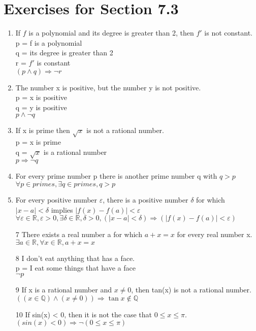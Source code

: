 \documentclass[12pt]{article}
\begin{document}
\section*{Exercises for Section 7.3}
\begin{enumerate}
	\item If $f$ is a polynomial and its degree is greater than 2, then $f'$ is not constant.\\
	    p = f is a polynomial\\
	    q = its degree is greater than 2\\
	    r = $f'$ is constant\\
	    $(p \land q) \Rightarrow \neg r$
	\item The number x is positive, but the number y is not positive.\\
	    p = x is positive\\
	    q = y is positive\\
	    $p \land \neg q$
	\item If x is prime then $\sqrt{x}$ is not a rational number.\\
	    p = x is prime\\
	    q = $\sqrt{x}$ is a rational number\\
	    $p \Rightarrow \neg q$
	\item For every prime number p there is another prime number q with $q>p$\\
	    $\forall p \in primes, \exists q \in primes, q > p$
	\item For every positive number $\varepsilon$, there is a positive number $\delta$ for which $|x-a| < \delta$ implies $|f(x) - f(a)| < \varepsilon$\\
	    $\forall \varepsilon \in \mathbb{R}, \varepsilon > 0, \exists \delta \in \mathbb{R}, \delta > 0, (|x-a| < \delta) \Rightarrow (|f(x) - f(a)| < \varepsilon)$
	\item [7] There exists a real number a for which $a+x=x$ for every real number x.\\
	    $\exists a \in \mathbb{R}, \forall x \in \mathbb{R}, a+x=x$
	\item [8] I don't eat anything that has a face.\\
	    p = I eat some things that have a face\\
	    $\neg p$
	\item [9] If x is a rational number and $x\neq 0$, then tan(x) is not a rational number.\\
	    $((x\in \mathbb{Q}) \land (x \neq 0)) \Rightarrow \tan{x} \notin \mathbb{ Q}$
	\item [10] If sin(x) < 0, then it is not the case that $0\le x \leq \pi$.\\
	    $(sin(x) < 0) \Rightarrow \neg(0\le x \le \pi)$
\end{enumerate}
\end{document}
